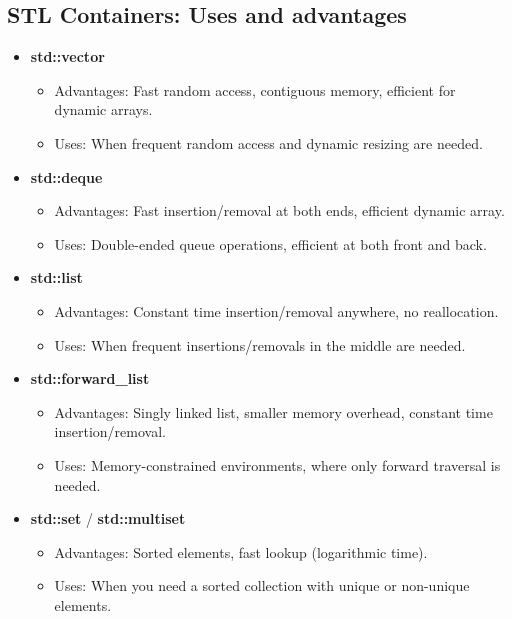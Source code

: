\documentclass{report}
\begin{document}
   \subsection{STL Containers: Uses and advantages}
   \begin{itemize}
    \item \textbf{std::vector}
    \begin{itemize}
        \item Advantages: Fast random access, contiguous memory, efficient for dynamic arrays.
        \item Uses: When frequent random access and dynamic resizing are needed.
    \end{itemize}
    
    \item \textbf{std::deque}
    \begin{itemize}
        \item Advantages: Fast insertion/removal at both ends, efficient dynamic array.
        \item Uses: Double-ended queue operations, efficient at both front and back.
    \end{itemize}
    
    \item \textbf{std::list}
    \begin{itemize}
        \item Advantages: Constant time insertion/removal anywhere, no reallocation.
        \item Uses: When frequent insertions/removals in the middle are needed.
    \end{itemize}
    
    \item \textbf{std::forward\_list}
    \begin{itemize}
        \item Advantages: Singly linked list, smaller memory overhead, constant time insertion/removal.
        \item Uses: Memory-constrained environments, where only forward traversal is needed.
    \end{itemize}
    
    \item \textbf{std::set} / \textbf{std::multiset}
    \begin{itemize}
        \item Advantages: Sorted elements, fast lookup (logarithmic time).
        \item Uses: When you need a sorted collection with unique or non-unique elements.
    \end{itemize}
    

\end{itemize}
\end{document}
